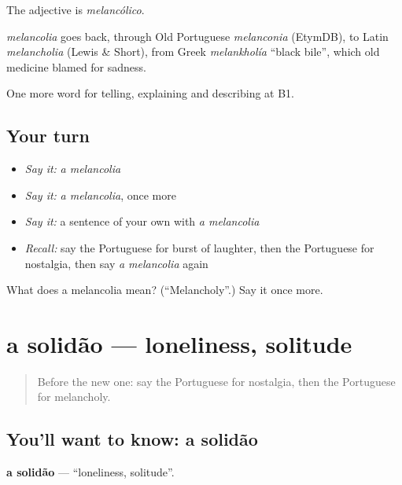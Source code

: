 The adjective is \emph{melancólico}.

\begin{cousinweb}
\emph{melancolia} goes back, through Old Portuguese \emph{melanconia} (EtymDB), to Latin \emph{melancholia} (Lewis \& Short), from Greek \emph{melankholía} \textquotedblleft{}black bile\textquotedblright{}, which old medicine blamed for sadness.
\end{cousinweb}

\begin{grammarlens}[title={What you've built}]
One more word for telling, explaining and describing at B1.
\end{grammarlens}

\subsection*{Your turn}
\begin{itemize}
\raggedright
  \item \emph{Say it:} \emph{a melancolia}
  \item \emph{Say it:} \emph{a melancolia}, once more
  \item \emph{Say it:} a sentence of your own with \emph{a melancolia}
  \item \emph{Recall:} say the Portuguese for burst of laughter, then the Portuguese for nostalgia, then say \emph{a melancolia} again
\end{itemize}

\begin{tcolorbox}[breakable,colback=teal!4,colframe=teal!35!black,title={Before you move on}]
What does a melancolia mean? (\textquotedblleft{}Melancholy\textquotedblright{}.) Say it once more.
\end{tcolorbox}
\section[a solidão]{a solidão — loneliness, solitude}

\label{lesson:PT-C478-solidao}



\begin{quote}
Before the new one: say the Portuguese for nostalgia, then the Portuguese for melancholy.
\end{quote}

\subsection*{You'll want to know: a solidão}
\textbf{a solidão} — \textquotedblleft{}loneliness, solitude\textquotedblright{}.

